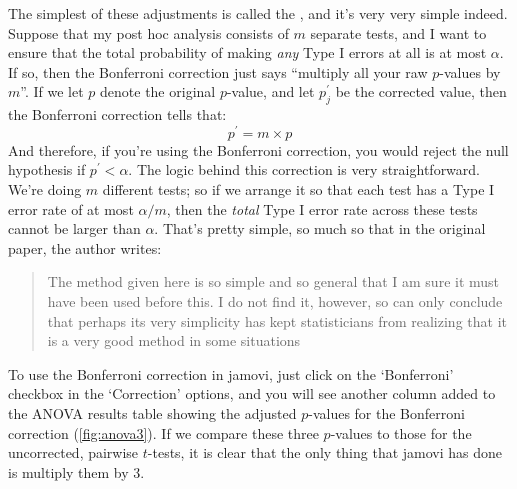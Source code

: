 
The simplest of these adjustments is called the  \cite{Dunn1961}, and it's very very simple indeed. Suppose that my post hoc analysis consists of $m$ separate tests, and I want to ensure that the total probability of making {\it any} Type I errors at all is at most $\alpha$. If so, then the Bonferroni correction just says ``multiply all your raw $p$-values by $m$''. If we let $p$ denote the original $p$-value, and let $p^\prime_j$ be the corrected value, then the Bonferroni correction tells that:
$$
p^\prime = m \times p
$$
And therefore, if you're using the Bonferroni correction, you would reject the null hypothesis if $p^\prime < \alpha$. The logic behind this correction is very straightforward. We're doing $m$ different tests; so if we arrange it so that each test has a Type I error rate of at most $\alpha / m$, then the {\it total} Type I error rate across these tests cannot be larger than $\alpha$. That's pretty simple, so much so that in the original paper, the author writes:
\begin{quote}
The method given here is so simple and so general that I am sure it must have been used before this. I do not find it, however, so can only conclude that perhaps its very simplicity has kept statisticians from realizing that it is a very good method in some situations \cite[pp 52-53]{Dunn1961}
\end{quote}
To use the Bonferroni correction in jamovi, just click on the `Bonferroni' checkbox in the `Correction' options, and you will see another column added to the ANOVA results table showing the adjusted $p$-values for the Bonferroni correction (\ref{fig:anova3}). If we compare these three $p$-values to those for the uncorrected, pairwise $t$-tests, it is clear that the only thing that jamovi has done is multiply them by 3. 


